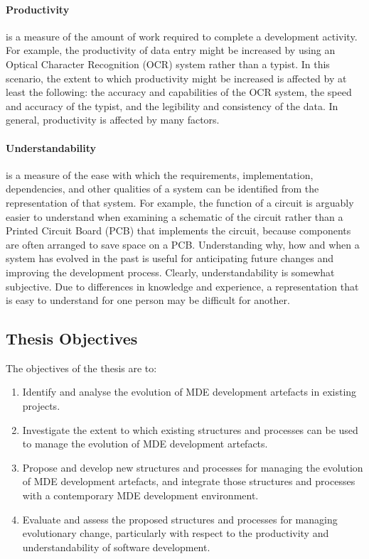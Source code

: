 \paragraph{Productivity} is a measure of the amount of work required to complete a development activity. For example, the productivity of data entry might be increased by using an Optical Character Recognition (OCR) system rather than a typist. In this scenario, the extent to which productivity might be increased is affected by at least the following: the accuracy and capabilities of the OCR system, the speed and accuracy of the typist, and the legibility and consistency of the data. In general, productivity is affected by many factors.


\paragraph{Understandability} is a measure of the ease with which the requirements, implementation, dependencies, and other qualities of a system can be identified from the representation of that system. For example, the function of a circuit is arguably easier to understand when examining a schematic of the circuit rather than a Printed Circuit Board (PCB) that implements the circuit, because components are often arranged to save space on a PCB. Understanding why, how and when a system has evolved in the past is useful for anticipating future changes and improving the development process. Clearly, understandability is somewhat subjective. Due to differences in knowledge and experience, a representation that is easy to understand for one person may be difficult for another. 


\subsection{Thesis Objectives}
The objectives of the thesis are to:

\begin{enumerate}
	\item Identify and analyse the evolution of MDE development artefacts in existing projects.
	\item Investigate the extent to which existing structures and processes can be used to manage the evolution of MDE development artefacts. 
	\item Propose and develop new structures and processes for managing the evolution of MDE development artefacts, and integrate those structures and processes with a contemporary MDE development environment.
	\item Evaluate and assess the proposed structures and processes for managing evolutionary change, particularly with respect to the productivity and understandability of software development.
\end{enumerate}
